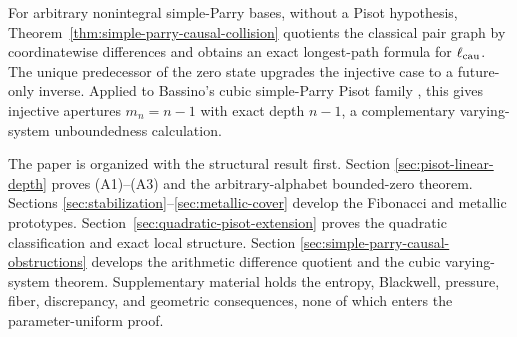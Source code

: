 For arbitrary nonintegral simple-Parry bases, without a Pisot hypothesis,
Theorem~\ref{thm:simple-parry-causal-collision} quotients the classical pair
graph by coordinatewise differences and obtains an exact longest-path formula
for $\ell_{\rm cau}$.  The unique predecessor of the zero state upgrades the
injective case to a future-only inverse.  Applied to Bassino's cubic
simple-Parry Pisot family \cite{Bassino2002}, this gives injective apertures
$m_n=n-1$ with exact depth $n-1$, a complementary varying-system
unboundedness calculation.

The paper is organized with the structural result first.  Section
\ref{sec:pisot-linear-depth} proves \textup{(A1)}--\textup{(A3)} and the
arbitrary-alphabet bounded-zero theorem.  Sections
\ref{sec:stabilization}--\ref{sec:metallic-cover} develop the Fibonacci and
metallic prototypes.  Section~\ref{sec:quadratic-pisot-extension} proves the
quadratic classification and exact local structure.  Section
\ref{sec:simple-parry-causal-obstructions} develops the arithmetic difference
quotient and the cubic varying-system theorem.  Supplementary material holds
the entropy, Blackwell, pressure, fiber, discrepancy, and geometric
consequences, none of which enters the parameter-uniform proof.
